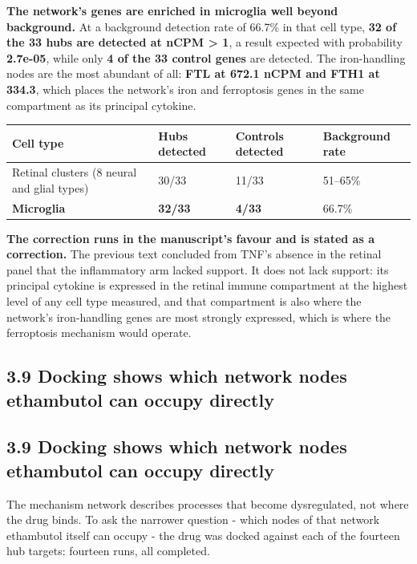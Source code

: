 \documentclass[utf8]{FrontiersinVancouver}
\begin{document}
\textbf{The network's genes are enriched in microglia well beyond background.} At a background detection rate of 66.7\% in that cell type, \textbf{32 of the 33 hubs are detected at nCPM > 1}, a result expected with probability \textbf{2.7e-05}, while only \textbf{4 of the 33 control genes} are detected. The iron-handling nodes are the most abundant of all: \textbf{FTL at 672.1 nCPM and FTH1 at 334.3}, which places the network's iron and ferroptosis genes in the same compartment as its principal cytokine.

\begin{table}[htbp]
\centering
\begin{tabular}{llll}
\hline
Cell type & Hubs detected & Controls detected & Background rate \\
\hline
Retinal clusters (8 neural and glial types) & 30/33 & 11/33 & 51--65\% \\
\textbf{Microglia} & \textbf{32/33} & \textbf{4/33} & 66.7\% \\
\hline
\end{tabular}
\end{table}

\textbf{The correction runs in the manuscript's favour and is stated as a correction.} The previous text concluded from TNF's absence in the retinal panel that the inflammatory arm lacked support. It does not lack support: its principal cytokine is expressed in the retinal immune compartment at the highest level of any cell type measured, and that compartment is also where the network's iron-handling genes are most strongly expressed, which is where the ferroptosis mechanism would operate.

\subsection{3.9 Docking shows which network nodes ethambutol can occupy directly}

\subsection{3.9 Docking shows which network nodes ethambutol can occupy directly}

The mechanism network describes processes that become dysregulated, not where the drug binds. To ask the narrower question - which nodes of that network ethambutol itself can occupy - the drug was docked against each of the fourteen hub targets: fourteen runs, all completed.
\end{document}
